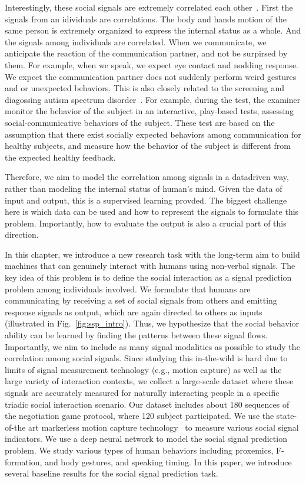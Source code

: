 Interestingly, these social signals are extremely correlated each other~\cite{}. First the signals from an idividuals are correlations. The body and hands motion of the same person is extremely organized to express the internal status as a whole. And the signals among individuals are correlated. When we communicate, we anticipate the reaction of the communication partner, and not be surpirsed by them. For example, when we speak, we expect eye contact and nodding response. We expect the communication partner does not suddenly perform weird gestures and or unexpected behaviors. This is also closely related to the screening and diagossing autism spectrum disorder~\cite{stone2000brief, mathys2013beyond}. For example, during the test, the examiner monitor the behavior of the subject in an interactive, play-based tests,  assessing  social-communicative behaviors of the subject. These test are based on the assumption that there exist socially expected behaviors among communication for healthy subjects, and measure how the behavior of the subject is different from the expected healthy feedback.  

Therefore, we aim to model the correlation among signals in a datadriven way, rather than modeling the internal status of human's mind. Given the data of input and output, this is a supervised learning provded. The biggest challenge here is which data can be used and how to represent the signals to formulate this problem. Importantly, how to evaluate the output is also a crucial part of this direction.

In this chapter, we introduce a new research task with the long-term aim to build machines that can genuinely interact with humans using non-verbal signals. The key idea of this problem is to define the social interaction as a signal prediction problem among individuals involved. We formulate that humans are communicating by receiving a set of social signals from others and emitting response signals as output, which are again directed to others as inputs (illustrated in Fig.~\ref{fig:ssp_intro}). Thus, we hypothesize that the social behavior ability can be learned by finding the patterns between these signal flows. Importantly, we aim to include as many signal modalities as possible to study the correlation among social signals. Since studying this in-the-wild is hard due to limits of signal measurement technology (e.g., motion capture) as well as the large variety of interaction contexts, we collect a large-scale dataset where these signals are accurately measured for naturally interacting people in a specific triadic social interaction scenario. Our dataset includes about 180 sequences of the negotiation game protocol, where 120 subject participated. We use the state-of-the art markerless motion capture technology~\cite{joo2018} to measure various social signal indicators. We use a deep neural network to model the social signal prediction problem. We study various types of human behaviors including proxemics, F-formation, and body gestures, and speaking timing. In this paper, we introduce several baseline results for the social signal prediction task. 

